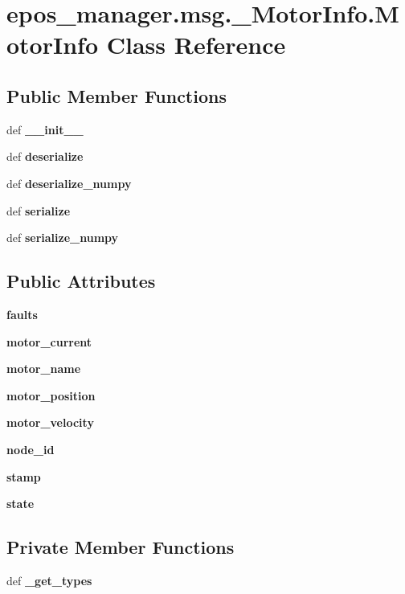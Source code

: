 \section{epos\-\_\-manager.\-msg.\-\_\-\-Motor\-Info.\-Motor\-Info \-Class \-Reference}
\label{classepos__manager_1_1msg_1_1__MotorInfo_1_1MotorInfo}
\subsection*{\-Public \-Member \-Functions}
\begin{DoxyCompactItemize}
\item 
def {\bf \-\_\-\-\_\-init\-\_\-\-\_\-}
\item 
def {\bf deserialize}
\item 
def {\bf deserialize\-\_\-numpy}
\item 
def {\bf serialize}
\item 
def {\bf serialize\-\_\-numpy}
\end{DoxyCompactItemize}
\subsection*{\-Public \-Attributes}
\begin{DoxyCompactItemize}
\item 
{\bf faults}
\item 
{\bf motor\-\_\-current}
\item 
{\bf motor\-\_\-name}
\item 
{\bf motor\-\_\-position}
\item 
{\bf motor\-\_\-velocity}
\item 
{\bf node\-\_\-id}
\item 
{\bf stamp}
\item 
{\bf state}
\end{DoxyCompactItemize}
\subsection*{\-Private \-Member \-Functions}
\begin{DoxyCompactItemize}
\item 
def {\bf \-\_\-get\-\_\-types}
\end{DoxyCompactItemize}
